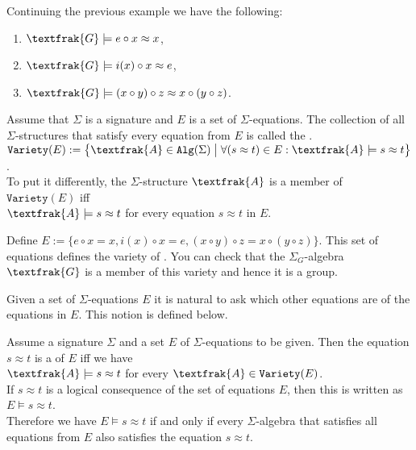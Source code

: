 \example
Continuing the previous example we have the following:
\begin{enumerate}
\item $\textfrak{G} \models e \circ x \approx x$,
\item $\textfrak{G} \models i(x) \circ x \approx e$,
\item $\textfrak{G} \models (x \circ y) \circ z \approx x \circ (y \circ z)$. \eoxs
\end{enumerate}

\begin{Definition}[$E$-Variety]
  Assume that $\Sigma$ is a signature and $E$ is a set of $\Sigma$-equations.  The collection of all
  $\Sigma$-structures that satisfy every equation from $E$ is called the .
  \\[0.2cm]
  \hspace*{1.3cm}
  $\texttt{Variety}(E) := \bigl\{ \textfrak{A}\in \mathtt{Alg}(\Sigma) \bigm| 
                             \forall (s \approx t) \in E: \textfrak{A} \models s \approx t \bigr\}$.
  \\[0.2cm]
  To put it differently, the $\Sigma$-structure $\textfrak{A}$ is a member of $\mathtt{Variety}(E)$ iff
  \\[0.2cm]
  \hspace*{1.3cm}
  $\textfrak{A} \models s \approx t$ \quad for every equation $s \approx t$ in $E$. \eoxs
\end{Definition}

\example
Define $E := \bigl\{ e \circ x = x, i(x) \circ x = e, (x \circ y) \circ z = x \circ (y \circ z) \bigr\}$.
This set of equations defines the variety of .  You can check that the $\Sigma_G$-algebra
$\textfrak{G}$ is a member of this variety and hence it is a group.  
\eoxs

Given a set of $\Sigma$-equations $E$ it is natural to ask which other equations are  of
the equations in $E$.  This notion is defined below. 

\begin{Definition}
  Assume a signature $\Sigma$ and a set $E$ of $\Sigma$-equations to be given.
  Then the equation $s \approx t$ is a  of $E$ iff we have
  \\[0.2cm]
  \hspace*{1.3cm}
  $\textfrak{A} \models s \approx t$ \quad for every $\textfrak{A} \in \mathtt{Variety}(E)$.
  \\[0.2cm]
  If $s \approx t$ is a logical consequence of the set of equations $E$, then this is written as
  \\[0.2cm]
  \hspace*{1.3cm}
  $E \models s \approx t$.
  \\[0.2cm]
  Therefore we have $E \models s \approx t$ if and only if every $\Sigma$-algebra that satisfies all equations
  from $E$ also satisfies the equation $s \approx t$. \eoxs
\end{Definition}

